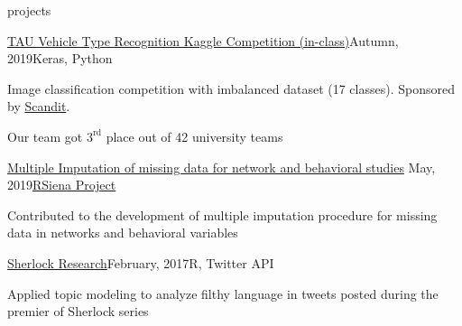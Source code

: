 \documentclass[]{resume} %
\begin{document}
\begin{rSection}{projects}
  
  
  \begin{rSubsection}{\href{https://github.com/schatt89/VehicleRecognition}{TAU Vehicle Type Recognition Kaggle Competition (in-class)}}{Autumn, 2019}{Keras, Python}{~}
      \item Image classification competition with imbalanced dataset (17 classes). Sponsored by \href{https://www.scandit.com/}{Scandit}.
        \item Our team got $3^{\text{rd}}$ place out of 42 university teams\\[-1.5em]
  \end{rSubsection}
  
  \begin{rSubsection}{\hspace{-1ex} \href{https://www.stats.ox.ac.uk/~snijders/siena/MultipleImputationNetworkAndBehavior.html}{Multiple Imputation of missing data for network and behavioral studies} \hfill}{May, 2019}{\href{https://www.stats.ox.ac.uk/~snijders/siena/}{RSiena Project}}{~}
      \item Contributed to the development of multiple imputation procedure for missing data in networks and behavioral variables \\[-4.5ex]
  \end{rSubsection}
  
  \begin{rSubsection}{\href{https://schatt89.github.io/sherlocknight/}{Sherlock Research}}{February, 2017}{R, Twitter API}{~} %
    \item Applied topic modeling to analyze filthy language in tweets posted during the premier of Sherlock series \\[-4.5ex]
  \end{rSubsection}
  

\end{rSection}
\end{document}
